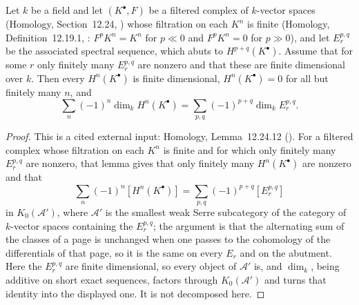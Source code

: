\begin{lemma}
\label{lem:pc-spectral-sequence-euler}
Let $k$ be a field and let $(K^\bullet,F)$ be a filtered complex of
$k$-vector spaces (Homology, Section~12.24,
) whose filtration on
each $K^n$ is finite (Homology, Definition~12.19.1,
: $F^pK^n=K^n$ for
$p\ll0$ and $F^pK^n=0$ for $p\gg0$), and let $E_r^{p,q}$ be the
associated spectral sequence, which abuts to $H^{p+q}(K^\bullet)$.
Assume that for some $r$ only finitely many $E_r^{p,q}$ are nonzero and
that these are finite dimensional over $k$.  Then every $H^n(K^\bullet)$
is finite dimensional, $H^n(K^\bullet)=0$ for all but finitely many $n$,
and
\[
\sum_{n}(-1)^n\dim_kH^n(K^\bullet)
=\sum_{p,q}(-1)^{p+q}\dim_kE_r^{p,q}.
\]
\end{lemma}
\begin{proof}
This is a cited external input: Homology, Lemma~12.24.12
().  For a filtered
complex whose filtration on each $K^n$ is finite and for which only
finitely many $E_r^{p,q}$ are nonzero, that lemma gives that only
finitely many $H^n(K^\bullet)$ are nonzero and that
\[
\sum_{n}(-1)^n[H^n(K^\bullet)]=\sum_{p,q}(-1)^{p+q}[E_r^{p,q}]
\]
in $K_0(\mathcal{A}')$, where $\mathcal{A}'$ is the smallest weak Serre
subcategory of the category of $k$-vector spaces containing the
$E_r^{p,q}$; the argument is that the alternating sum of the classes of
a page is unchanged when one passes to the cohomology of the
differentials of that page, so it is the same on every $E_r$ and on the
abutment.  Here the
$E_r^{p,q}$ are finite dimensional, so every object of $\mathcal{A}'$
is, and $\dim_k$, being additive on short exact sequences, factors
through $K_0(\mathcal{A}')$ and turns that identity into the displayed
one.  It is not decomposed here.
\end{proof}


